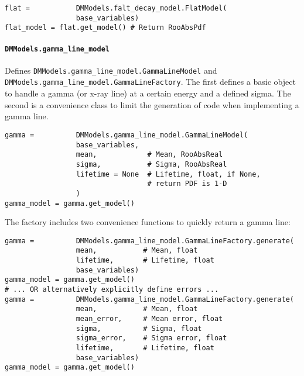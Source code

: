 				\begin{lstlisting}			
flat =           DMModels.falt_decay_model.FlatModel(
                 base_variables)     
flat_model = flat.get_model() # Return RooAbsPdf
				\end{lstlisting}				

			\paragraph{\lstinline!DMModels.gamma_line_model!}
Defines \lstinline!DMModels.gamma_line_model.GammaLineModel! and \lstinline!DMModels.gamma_line_model.GammaLineFactory!.  The
first defines a basic object to handle a gamma (or x-ray line) at a certain energy and a defined sigma.  The second is a 
convenience class to limit the generation of code when implementing a gamma line. 
				\begin{lstlisting}			
gamma =          DMModels.gamma_line_model.GammaLineModel(
                 base_variables,
                 mean,            # Mean, RooAbsReal
                 sigma,           # Sigma, RooAbsReal
                 lifetime = None  # Lifetime, float, if None, 
                                  # return PDF is 1-D
                 )
gamma_model = gamma.get_model()
				\end{lstlisting}				
The factory includes two convenience functions to quickly return a gamma line:
				\begin{lstlisting}			
gamma =          DMModels.gamma_line_model.GammaLineFactory.generate(
                 mean,           # Mean, float
                 lifetime,       # Lifetime, float
                 base_variables)
gamma_model = gamma.get_model()
# ... OR alternatively explicitly define errors ...
gamma =          DMModels.gamma_line_model.GammaLineFactory.generate(
                 mean,           # Mean, float
                 mean_error,     # Mean error, float
                 sigma,          # Sigma, float
                 sigma_error,    # Sigma error, float
                 lifetime,       # Lifetime, float
                 base_variables)
gamma_model = gamma.get_model()

				\end{lstlisting}				

